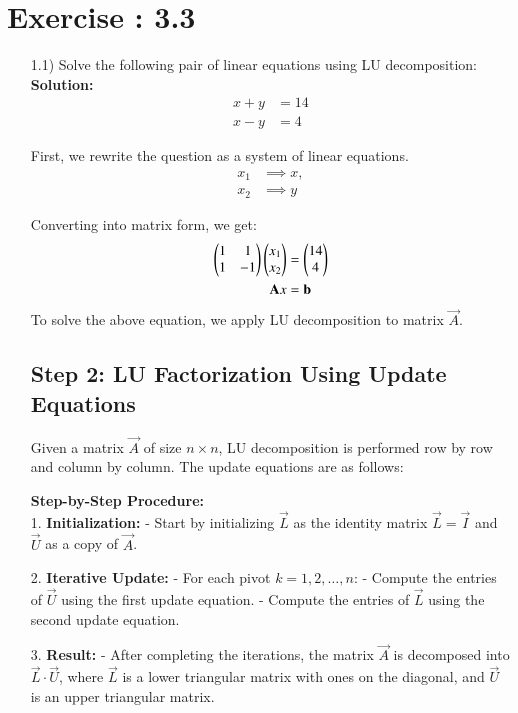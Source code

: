 \documentclass[journal]{IEEEtran}
\begin{document}
\section*{Exercise : 3.3}
\begin{enumerate}
\item [1.1)] Solve the following pair of linear equations using LU decomposition:\\
\textbf{Solution:}\\
\begin{align}
    x + y &= 14 \\
    x - y &= 4
\end{align}

First, we rewrite the question as a system of linear equations.
\begin{align}
    x_1 &\implies x, \\
    x_2 &\implies y
\end{align}

Converting into matrix form, we get:
\begin{align}
    \begin{pmatrix}1 & 1\\ 1 & -1\end{pmatrix}\begin{pmatrix}x_1 \\ x_2\end{pmatrix} &= \begin{pmatrix}14 \\ 4\end{pmatrix} \\
    \mathbf{A}x &= \mathbf{b}
\end{align}
To solve the above equation, we apply LU decomposition to matrix \(\vec{A}\).

\subsection*{Step 2: LU Factorization Using Update Equations}
Given a matrix $\vec{A}$ of size $n \times n$, LU decomposition is performed row by row and column by column. The update equations are as follows:

\textbf{Step-by-Step Procedure:}\\
1. \textbf{Initialization:}  
   - Start by initializing $\vec{L}$ as the identity matrix $\vec{L} = \vec{I}$ and $\vec{U}$ as a copy of $\vec{A}$.

2. \textbf{Iterative Update:}  
   - For each pivot $k = 1, 2, \ldots, n$:  
     - Compute the entries of $\vec{U}$ using the first update equation.  
     - Compute the entries of $\vec{L}$ using the second update equation.  

3. \textbf{Result:}  
   - After completing the iterations, the matrix $\vec{A}$ is decomposed into $\vec{L} \cdot \vec{U}$, where $\vec{L}$ is a lower triangular matrix with ones on the diagonal, and $\vec{U}$ is an upper triangular matrix.


\end{enumerate}
\end{document}

